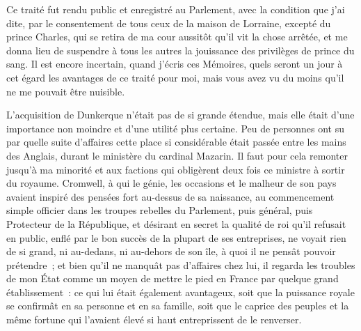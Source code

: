 \documentclass[french,twoside]{book} %
\begin{document}
Ce traité fut rendu public et enregistré au Parlement, avec la condition que j’ai dite, par le consentement de tous ceux de la maison de Lorraine, excepté du prince Charles, qui se retira de ma cour aussitôt qu’il vit la chose arrêtée, et me donna lieu de suspendre à tous les autres la jouissance des privilèges de prince du sang. Il est encore incertain, quand j’écris ces Mémoires, quels seront un jour à cet égard les avantages de ce traité pour moi, mais vous avez vu du moins qu’il ne me pouvait être nuisible.\par
L’acquisition de Dunkerque n’était pas de si grande étendue, mais elle était d’une importance non moindre et d’une utilité plus certaine. Peu de personnes ont su par quelle suite d’affaires cette place si considérable était passée entre les mains des Anglais, durant le ministère du cardinal Mazarin. Il faut pour cela remonter jusqu’à ma minorité et aux factions qui obligèrent deux fois ce ministre à sortir du royaume. Cromwell, à qui le génie, les occasions et le malheur de son pays avaient inspiré des pensées fort au-dessus de sa naissance, au commencement simple officier dans les troupes rebelles du Parlement, puis général, puis Protecteur de la République, et désirant en secret la qualité de roi qu’il refusait en public, enflé par le bon succès de la plupart de ses entreprises, ne voyait rien de si grand, ni au-dedans, ni au-dehors de son île, à quoi il ne pensât pouvoir prétendre ; et bien qu’il ne manquât pas d’affaires chez lui, il regarda les troubles de mon État comme un moyen de mettre le pied en France par quelque grand établissement : ce qui lui était également avantageux, soit que la puissance royale se confirmât en sa personne et en sa famille, soit que le caprice des peuples et la même fortune qui l’avaient élevé si haut entreprissent de le renverser.\par
\end{document}
